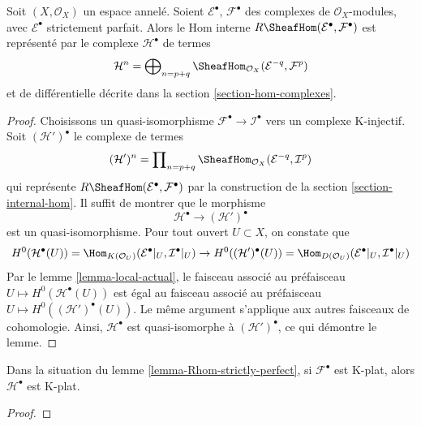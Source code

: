 {\begin{lemma}

\label{lemma-Rhom-strictly-perfect}
Soit $(X, \mathcal{O}_X)$ un espace annelé. Soient $\mathcal{E}^\bullet$, $\mathcal{F}^\bullet$ des complexes de $\mathcal{O}_X$-modules, avec $\mathcal{E}^\bullet$ strictement parfait. Alors le Hom interne $R\SheafHom(\mathcal{E}^\bullet, \mathcal{F}^\bullet)$ est représenté par le complexe $\mathcal{H}^\bullet$ de termes $$
\mathcal{H}^n =
\bigoplus\nolimits_{n = p + q}
\SheafHom_{\mathcal{O}_X}(\mathcal{E}^{-q}, \mathcal{F}^p)
$$ et de différentielle décrite dans la section \ref{section-hom-complexes}.
\end{lemma}

\begin{proof}

Choisissons un quasi-isomorphisme $\mathcal{F}^\bullet \to \mathcal{I}^\bullet$
vers un complexe K-injectif. Soit $(\mathcal{H}')^\bullet$ le complexe de termes
$$
(\mathcal{H}')^n =
\prod\nolimits_{n = p + q}
\SheafHom_{\mathcal{O}_X}(\mathcal{E}^{-q}, \mathcal{I}^p)
$$
qui représente $R\SheafHom(\mathcal{E}^\bullet, \mathcal{F}^\bullet)$
par la construction de la section \ref{section-internal-hom}. Il suffit de montrer que le morphisme
$$
\mathcal{H}^\bullet \longrightarrow (\mathcal{H}')^\bullet
$$
est un quasi-isomorphisme. Pour tout ouvert $U \subset X$, on constate que
$$
H^0(\mathcal{H}^\bullet(U)) =
\Hom_{K(\mathcal{O}_U)}(\mathcal{E}^\bullet|_U, \mathcal{I}^\bullet|_U)
\to
H^0((\mathcal{H}')^\bullet(U)) =
\Hom_{D(\mathcal{O}_U)}(\mathcal{E}^\bullet|_U, \mathcal{I}^\bullet|_U)
$$
Par le lemme \ref{lemma-local-actual}, le faisceau associé au préfaisceau
$U \mapsto H^0(\mathcal{H}^\bullet(U))$
est égal au faisceau associé au préfaisceau
$U \mapsto H^0((\mathcal{H}')^\bullet(U))$. Le même argument s'applique aux autres faisceaux de cohomologie. Ainsi, $\mathcal{H}^\bullet$
est quasi-isomorphe à $(\mathcal{H}')^\bullet$, ce qui démontre le lemme.

\end{proof}

\begin{lemma}

\label{lemma-Rhom-strictly-perfect-K-flat}
Dans la situation du lemme \ref{lemma-Rhom-strictly-perfect}, si $\mathcal{F}^\bullet$ est K-plat, alors $\mathcal{H}^\bullet$ est K-plat.
\end{lemma}

\begin{proof}


\end{proof}}
